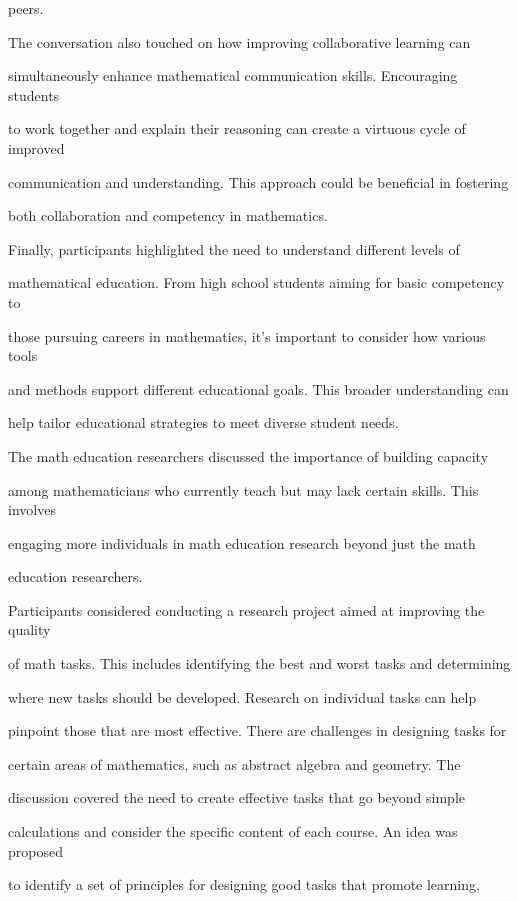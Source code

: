 \documentclass[11pt]{article}
\begin{document}
peers.

The conversation also touched on how improving collaborative learning can

simultaneously enhance mathematical communication skills. Encouraging students

to work together and explain their reasoning can create a virtuous cycle of improved

communication and understanding. This approach could be beneficial in fostering

both collaboration and competency in mathematics.

Finally, participants highlighted the need to understand different levels of

mathematical education. From high school students aiming for basic competency to

those pursuing careers in mathematics, it's important to consider how various tools

and methods support different educational goals. This broader understanding can

help tailor educational strategies to meet diverse student needs.

The math education researchers discussed the importance of building capacity

among mathematicians who currently teach but may lack certain skills. This involves

engaging more individuals in math education research beyond just the math

education researchers.

Participants considered conducting a research project aimed at improving the quality

of math tasks. This includes identifying the best and worst tasks and determining

where new tasks should be developed. Research on individual tasks can help

pinpoint those that are most effective. There are challenges in designing tasks for

certain areas of mathematics, such as abstract algebra and geometry. The

discussion covered the need to create effective tasks that go beyond simple

calculations and consider the specific content of each course. An idea was proposed

to identify a set of principles for designing good tasks that promote learning,
\end{document}
